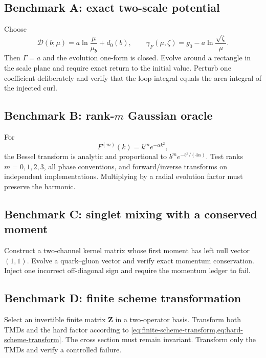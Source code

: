 \documentclass[11pt]{article}
\newcommand{\cD}{\mathcal D}
\begin{document}
\subsection{Benchmark A: exact two-scale potential}

Choose
\begin{equation}
 \cD(b;\mu)=a\ln\frac{\mu}{\mu_b}+d_0(b),
 \qquad
 \gamma_F(\mu,\zeta)=g_0-a\ln\frac{\sqrt\zeta}{\mu}.
 \label{eq:benchmark-a-anom}
\end{equation}
Then \(\Gamma=a\) and the evolution one-form is closed.  Evolve around a
rectangle in the scale plane and require exact return to the initial value.
Perturb one coefficient deliberately and verify that the loop integral equals
the area integral of the injected curl.

\subsection{Benchmark B: rank-\texorpdfstring{\(m\)}{m} Gaussian oracle}

For
\begin{equation}
 F^{(m)}(k)=k^m e^{-\alpha k^2},
 \label{eq:rank-gaussian}
\end{equation}
the Bessel transform is analytic and proportional to
\(b^m e^{-b^2/(4\alpha)}\).  Test ranks \(m=0,1,2,3\), all phase conventions,
and forward/inverse transforms on independent implementations.  Multiplying
by a radial evolution factor must preserve the harmonic.

\subsection{Benchmark C: singlet mixing with a conserved moment}

Construct a two-channel kernel matrix whose first moment has left null vector
\((1,1)\).  Evolve a quark--gluon vector and verify exact momentum
conservation.  Inject one incorrect off-diagonal sign and require the momentum
ledger to fail.

\subsection{Benchmark D: finite scheme transformation}

Select an invertible finite matrix \(\bm Z\) in a two-operator basis.  Transform
both TMDs and the hard factor according to
\cref{eq:finite-scheme-transform,eq:hard-scheme-transform}.  The cross section
must remain invariant.  Transform only the TMDs and verify a controlled
failure.
\end{document}
